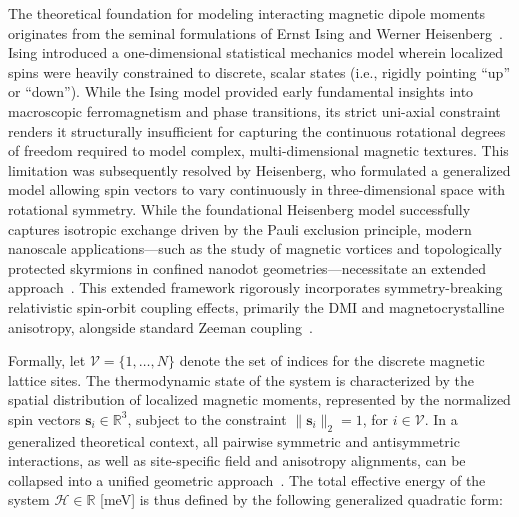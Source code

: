 \documentclass[a4paper,fleqn]{cas-sc}
\begin{document}
The theoretical foundation for modeling interacting magnetic dipole moments originates from the seminal formulations of Ernst Ising and Werner Heisenberg~\cite{agudelo2019study}. Ising introduced a one-dimensional statistical mechanics model wherein localized spins were heavily constrained to discrete, scalar states (i.e., rigidly pointing ``up'' or ``down''). While the Ising model provided early fundamental insights into macroscopic ferromagnetism and phase transitions, its strict uni-axial constraint renders it structurally insufficient for capturing the continuous rotational degrees of freedom required to model complex, multi-dimensional magnetic textures. This limitation was subsequently resolved by Heisenberg, who formulated a generalized model allowing spin vectors to vary continuously in three-dimensional space with rotational symmetry. While the foundational 
Heisenberg model successfully captures isotropic exchange driven by the Pauli exclusion principle, modern nanoscale applications—such as the study of magnetic vortices and topologically protected skyrmions in confined nanodot geometries—necessitate an extended 
approach~\cite{fert2024electrical}. This extended framework rigorously incorporates symmetry-breaking relativistic spin-orbit coupling effects, primarily the DMI and magnetocrystalline anisotropy, alongside standard Zeeman coupling~\cite{borisov2021heisenberg}.

Formally, let $\mathcal{V} = \{1, \dots, N\}$ denote the set of indices for the discrete magnetic lattice sites. The thermodynamic state of the system is characterized by the spatial distribution of localized magnetic moments, represented by the normalized spin vectors $\mathbf{s}_i \in \mathbb{R}^3$, subject to the constraint 
$\|\mathbf{s}_i\|_2 = 1$, for $i\in\mathcal{V}$. In a generalized theoretical context, all pairwise symmetric and antisymmetric interactions, as well as site-specific field and anisotropy alignments, can be collapsed into a unified geometric approach~\cite{moriya1960anisotropic,eriksson2017atomistic}. The total effective energy of the system $\mathcal{H}\in\mathbb{R}$ [meV] is thus defined by the following generalized quadratic form:
\end{document}
